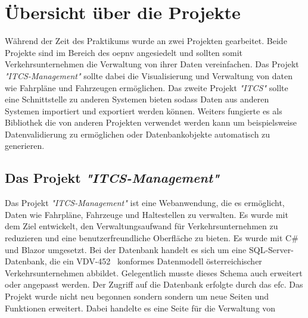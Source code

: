 \section{Übersicht über die Projekte}
    Während der Zeit des Praktikums wurde an zwei Projekten gearbeitet. Beide Projekte sind im Bereich des \gls{oepnv} angesiedelt und sollten somit Verkehrsunternehmen die Verwaltung von ihrer Daten 
    vereinfachen. Das Projekt \emph{"ITCS-Management"} sollte dabei die Visualisierung und Verwaltung von daten wie Fahrpläne und Fahrzeugen ermöglichen. Das zweite Projekt 
    \emph{"ITCS"} sollte eine Schnittstelle zu anderen Systemen bieten sodass Daten aus anderen Systemen importiert und exportiert werden können. Weiters fungierte es als Bibliothek 
    die von anderen Projekten verwendet werden kann um beispielsweise Datenvalidierung zu ermöglichen oder Datenbankobjekte automatisch zu generieren.

\subsection{Das Projekt \emph{"ITCS-Management"}}
    Das Projekt \emph{"ITCS-Management"} ist eine Webanwendung, die es ermöglicht, Daten wie Fahrpläne, Fahrzeuge und Haltestellen zu verwalten. Es wurde mit dem Ziel entwickelt, den 
    Verwaltungsaufwand für Verkehrsunternehmen zu reduzieren und eine benutzerfreundliche Oberfläche zu bieten. Es wurde mit C\# und Blazor umgesetzt. Bei der Datenbank
    handelt es sich um eine SQL-Server-Datenbank, die ein VDV-452~\cite{VDV452} konformes
    Datenmodell österreichischer Verkehrsunternehmen abbildet. Gelegentlich musste dieses
    Schema auch erweitert oder angepasst werden. Der Zugriff auf die Datenbank erfolgte durch das \gls{efc}. 
    Das Projekt wurde nicht neu begonnen sondern sondern um neue Seiten und Funktionen erweitert.
    Dabei handelte es eine Seite für die Verwaltung von 
